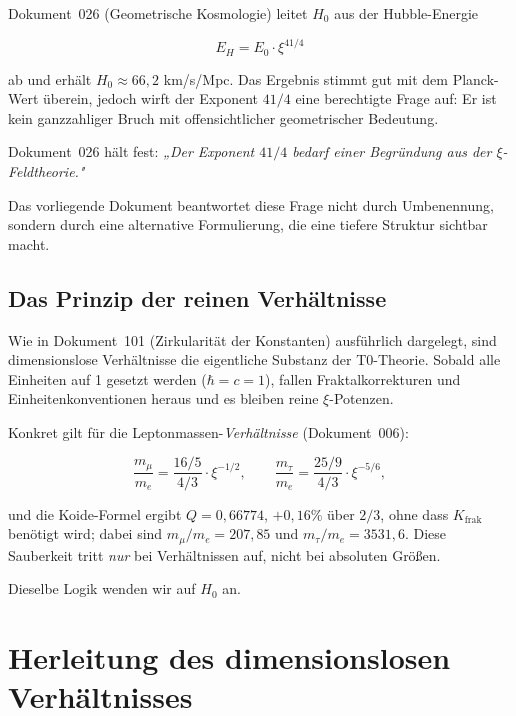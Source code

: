 Dokument~026 (Geometrische Kosmologie) leitet $H_0$ aus der Hubble-Energie

\begin{equation}
    E_H = E_0 \cdot \xi^{41/4}
    \label{eq:EH_026}
\end{equation}

ab und erhält $H_0 \approx 66{,}2$ km/s/Mpc. Das Ergebnis stimmt gut mit dem
Planck-Wert überein, jedoch wirft der Exponent $41/4$ eine berechtigte Frage
auf: Er ist kein ganzzahliger Bruch mit offensichtlicher geometrischer
Bedeutung.

Dokument~026 hält fest: \textit{„Der Exponent $41/4$ bedarf einer Begründung
aus der $\xi$-Feldtheorie."}

Das vorliegende Dokument beantwortet diese Frage nicht durch Umbenennung,
sondern durch eine alternative Formulierung, die eine tiefere Struktur
sichtbar macht.

\subsection{Das Prinzip der reinen Verhältnisse}

Wie in Dokument~101 (Zirkularität der Konstanten) ausführlich dargelegt, sind
dimensionslose Verhältnisse die eigentliche Substanz der T0-Theorie. Sobald
alle Einheiten auf 1 gesetzt werden ($\hbar = c = 1$), fallen Fraktalkorrek\-turen
und Einheitenkonventionen heraus und es bleiben reine $\xi$-Potenzen.

Konkret gilt für die Leptonmassen-\emph{Verhältnisse} (Dokument~006):

\begin{equation}
    \frac{m_\mu}{m_e} = \frac{16/5}{4/3} \cdot \xi^{-1/2}, \qquad
    \frac{m_\tau}{m_e} = \frac{25/9}{4/3} \cdot \xi^{-5/6},
\end{equation}

und die Koide-Formel ergibt $Q = 0{,}66774$, $+0{,}16\%$ über $2/3$, ohne dass $K_\text{frak}$
benötigt wird; dabei sind $m_\mu/m_e = 207{,}85$ und $m_\tau/m_e = 3531{,}6$. Diese Sauberkeit tritt \emph{nur} bei Verhältnissen auf,
nicht bei absoluten Größen.

Dieselbe Logik wenden wir auf $H_0$ an.

\section{Herleitung des dimensionslosen Verhältnisses}
\label{sec:herleitung}

